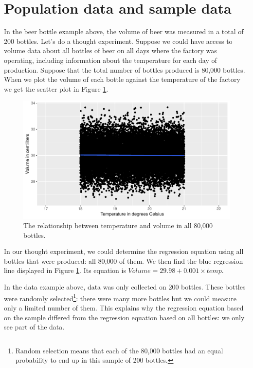 \documentclass[]{report}\usepackage[]{graphicx}\usepackage[]{color}
\makeatletter
\def\maxwidth{ %
  \ifdim\Gin@nat@width>\linewidth
    \linewidth
  \else
    \Gin@nat@width
  \fi
}
\newenvironment{knitrout}{}{} %
\makeatother
\begin{document}
\section{Population data and sample data}

In the beer bottle example above, the volume of beer was measured in a total of 200 bottles. Let's do a thought experiment. Suppose we could have access to volume data about all bottles of beer on all days where the factory was operating, including information about the temperature for each day of production. Suppose that the total number of bottles produced is 80,000 bottles. When we plot the volume of each bottle against the temperature of the factory we get the scatter plot in Figure \ref{fig:inf_1}.


\begin{knitrout}
\color{fgcolor}\begin{figure}

{\centering \includegraphics[width=\maxwidth]{figure/inf_1-1} 

}

\caption[The relationship between temperature and volume in all 80,000 bottles]{The relationship between temperature and volume in all 80,000 bottles.}\label{fig:inf_1}
\end{figure}


\end{knitrout}


In our thought experiment, we could determine the regression equation using all bottles that were produced: all 80,000 of them. We then find the blue regression line displayed in Figure \ref{fig:inf_1}. Its equation is $Volume = 29.98 + 0.001 \times temp$.


In the data example above, data was only collected on 200 bottles. These bottles were randomly selected\footnote{Random selection means that each of the 80,000 bottles had an equal probability to end up in this sample of 200 bottles.}: there were many more bottles but we could measure only a limited number of them. This explains why the regression equation based on the sample differed from the regression equation based on all bottles: we only see part of the data.
\end{document}
